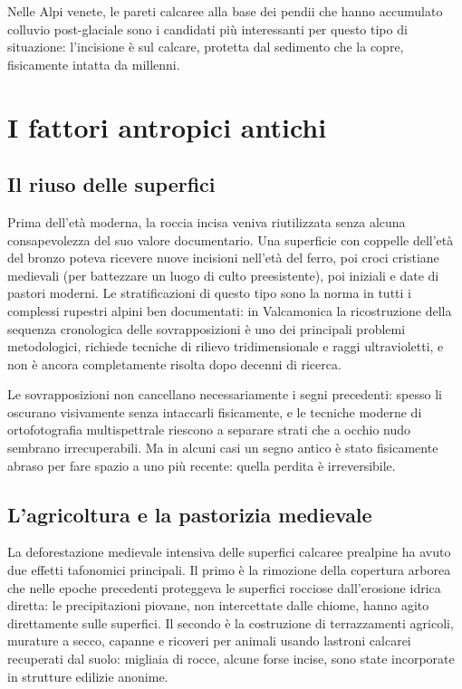 Nelle Alpi venete, le pareti calcaree alla base dei pendii che hanno accumulato colluvio post-glaciale sono i candidati più interessanti per questo tipo di situazione: l'incisione è sul calcare, protetta dal sedimento che la copre, fisicamente intatta da millenni.

\section{I fattori antropici antichi}

\subsection{Il riuso delle superfici}

Prima dell'età moderna, la roccia incisa veniva riutilizzata senza alcuna consapevolezza del suo valore documentario. Una superficie con coppelle dell'età del bronzo poteva ricevere nuove incisioni nell'età del ferro, poi croci cristiane medievali (per battezzare un luogo di culto preesistente), poi iniziali e date di pastori moderni. Le stratificazioni di questo tipo sono la norma in tutti i complessi rupestri alpini ben documentati: in Valcamonica la ricostruzione della sequenza cronologica delle sovrapposizioni è uno dei principali problemi metodologici, richiede tecniche di rilievo tridimensionale e raggi ultravioletti, e non è ancora completamente risolta dopo decenni di ricerca.

Le sovrapposizioni non cancellano necessariamente i segni precedenti: spesso li oscurano visivamente senza intaccarli fisicamente, e le tecniche moderne di ortofotografia multispettrale riescono a separare strati che a occhio nudo sembrano irrecuperabili. Ma in alcuni casi un segno antico è stato fisicamente abraso per fare spazio a uno più recente: quella perdita è irreversibile.

\subsection{L'agricoltura e la pastorizia medievale}

La deforestazione medievale intensiva delle superfici calcaree prealpine ha avuto due effetti tafonomici principali. Il primo è la rimozione della copertura arborea che nelle epoche precedenti proteggeva le superfici rocciose dall'erosione idrica diretta: le precipitazioni piovane, non intercettate dalle chiome, hanno agito direttamente sulle superfici. Il secondo è la costruzione di terrazzamenti agricoli, murature a secco, capanne e ricoveri per animali usando lastroni calcarei recuperati dal suolo: migliaia di rocce, alcune forse incise, sono state incorporate in strutture edilizie anonime.

